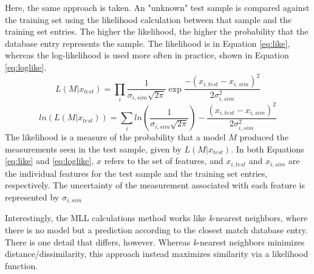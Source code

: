 Here, the same approach is taken. An "unknown" test sample is compared against
the training set using the likelihood calculation between that sample and the
training set entries.  The higher the likelihood, the higher the probability
that the database entry represents the sample. The likelihood is in Equation
\ref{eq:like}, whereas the log-likelihood is used more often in practice, shown
in Equation \ref{eq:loglike}.
\begin{equation}
  L(M|x_{test}) = \prod_i \frac{1}{\sigma_{i,sim} \sqrt{2\pi}} \exp{\frac{-(x_{i,test} - x_{i,sim})^2}{2 \sigma_{i,sim}^2}}
  \label{eq:like}
\end{equation}
\begin{equation}
  ln(L(M|x_{test})) = \sum_i ln(\frac{1}{\sigma_{i,sim} \sqrt{2\pi}}) - \frac{(x_{i,test} - x_{i,sim})^2}{2 \sigma_{i,sim}^2}
  \label{eq:loglike}
\end{equation}
The likelihood is a measure of the probability that a model $M$ produced the
measurements seen in the test sample, given by $L(M|x_{test})$.  In both
Equations \ref{eq:like} and \ref{eq:loglike}, $x$ refers to the set of
features, and $x_{i, test}$ and $x_{i,sim}$ are the individual features for the
test sample and the training set entries, respectively. The uncertainty of the
measurement associated with each feature is represented by $\sigma_{i,sim}$


Interestingly, the \gls{MLL} calculations method works like \textit{k}-nearest
neighbors, where there is no model but a prediction according to the closest
match database entry.  There is one detail that differs, however. Whereas
\textit{k}-nearest neighbors minimizes distance/dissimilarity, this approach
instead maximizes similarity via a likelihood function. 

